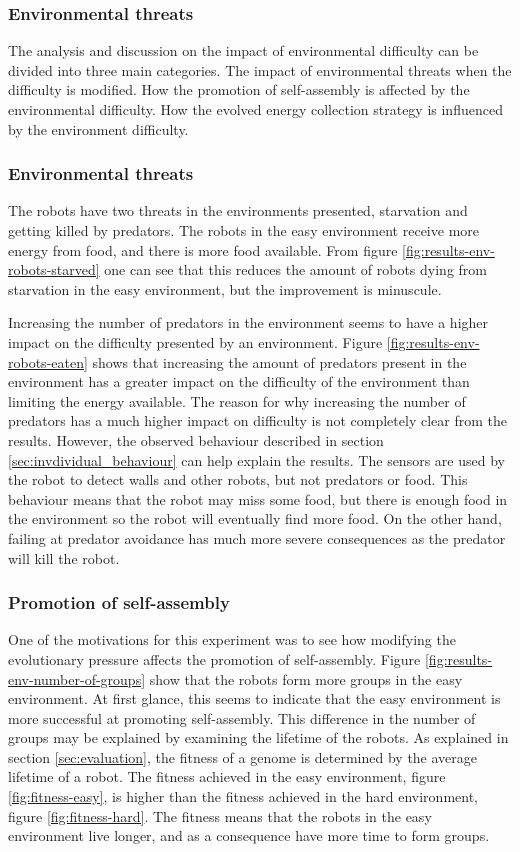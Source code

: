 \subsubsection{Environmental threats}
The analysis and discussion on the impact of environmental difficulty can be divided into three main categories.
The impact of environmental threats when the difficulty is modified.
How the promotion of self-assembly is affected by the environmental difficulty.
How the evolved energy collection strategy is influenced by the environment difficulty.    

\subsubsection{Environmental threats}
The robots have two threats in the environments presented, starvation and getting killed by predators.
The robots in the easy environment receive more energy from food, and there is more food available.
From figure \ref{fig:results-env-robots-starved} one can see that this reduces the amount of robots dying from starvation in the easy environment, but the improvement is minuscule.

Increasing the number of predators in the environment seems to have a higher impact on the difficulty presented by an environment.
Figure \ref{fig:results-env-robots-eaten} shows that increasing the amount of predators present in the environment has a greater impact on the difficulty of the environment than limiting the energy available.
The reason for why increasing the number of predators has a much higher impact on difficulty is not completely clear from the results.
However, the observed behaviour described in section \ref{sec:invdividual_behaviour} can help explain the results.
The sensors are used by the robot to detect walls and other robots, but not predators or food.
This behaviour means that the robot may miss some food, but there is enough food in the environment so the robot will eventually find more food.
On the other hand, failing at predator avoidance has much more severe consequences as the predator will kill the robot.

\subsubsection{Promotion of self-assembly}
One of the motivations for this experiment was to see how modifying the evolutionary pressure affects the promotion of self-assembly.
Figure \ref{fig:results-env-number-of-groups} show that the robots form more groups in the easy environment.
At first glance, this seems to indicate that the easy environment is more successful at promoting self-assembly.
This difference in the number of groups may be explained by examining the lifetime of the robots.
As explained in section \ref{sec:evaluation}, the fitness of a genome is determined by the average lifetime of a robot.
The fitness achieved in the easy environment, figure \ref{fig:fitness-easy}, is higher than the fitness achieved in the hard environment, figure \ref{fig:fitness-hard}.
The fitness means that the robots in the easy environment live longer, and as a consequence have more time to form groups.

